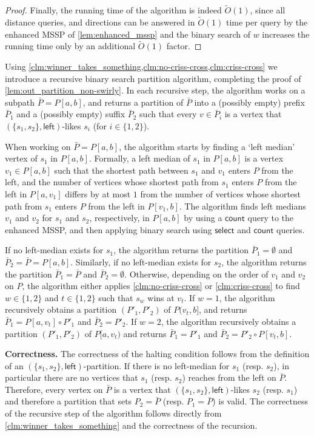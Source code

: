 \documentclass{article}
\newcommand{\leftside}{\mathsf{left}}
\newcommand{\countA}{\mathsf{count}}
\newcommand{\select}{\mathsf{select}}
\newcommand{\Otild}{\tilde{O}}
\begin{document}
\begin{proof}
Finally, the running time of the algorithm is indeed $\Otild(1)$, since all distance queries, and directions can be answered in $\Otild(1)$ time per query by the enhanced MSSP of \cref{lem:enhanced_mssp} and the binary search of $w$ increases the running time only by an additional $\Otild(1)$ factor.
\end{proof}


Using \cref{clm:winner_takes_something,clm:no-criss-cross,clm:criss-cross} we introduce a recursive binary search partition algorithm, completing the proof of \cref{lem:out_partition_non-swirly}.
In each recursive step, the algorithm works on a subpath $\bar P=P[a,b]$, and returns a partition of $\bar P$ into a (possibly empty) prefix $\bar P_1$ and a (possibly empty) suffix $\bar P_2$  such that every $v\in\bar P_i$  is a vertex that $(\{s_1,s_2\},\leftside)$-likes $s_i$ (for $i\in\{1,2\}$).

When working on $\bar P = P[a,b]$, the algorithm starts by finding a `left median' vertex of $s_1$ in $P[a,b]$.
Formally, a left median of $s_1$ in $P[a,b]$ is a vertex $v_1 \in P[a,b]$ such that the shortest path between $s_1$ and $v_1$ enters $P$ from the left, and the number of vertices whose shortest path from $s_1$ enters $P$ from the left  in $P[a,v_1]$ differs by at most  $1$ from the number of vertices whose shortest path from $s_1$ enters $P$ from the left in $P[v_1,b]$.
The algorithm finds left medians $v_1$ and $v_2$ for $s_1$ and $s_2$, respectively, in $P[a,b]$ by using a $\countA$ query to the enhanced MSSP, and then applying binary search using $\select$ and $\countA$ queries.

If no left-median exists for $s_1$, the algorithm returns the partition $\bar P_1 = \emptyset$ and $\bar P_2 = \bar P = P[a,b]$.
Similarly, if no left-median exists for $s_2$, the algorithm returns the partition $\bar P_1 = \bar{P}$ and $\bar P_2 = \emptyset$.
Otherwise, depending on the order of $v_1$ and $v_2$ on $P$, the algorithm either applies \cref{clm:no-criss-cross} or \cref{clm:criss-cross} to find $w\in \{ 1,2\}$ and $t\in \{1,2\}$ such that $s_w$ wins at $v_t$.
If $w=1$, the algorithm recursively obtains a partition $(P'_1,P'_2)$ of $P(v_t,b]$, and returns $\bar P_1 = P[a,v_t] \circ P'_1$ and $\bar P_2 = P'_2$.
If $w = 2$, the algorithm recursively obtains a partition $(P'_1,P'_2)$ of $P[a,v_t)$ and returns $\bar P_1 = P'_1$ and $\bar P_2 = P'_2 \circ P[v_t,b]$.

\medskip
\noindent
{\bf Correctness.}
The correctness of the halting condition follows from the definition of an $(\{s_1,s_2\},\leftside)$-partition.
If there is no left-median for $s_1$ (resp. $s_2$), in particular there are no vertices that $s_1$ (resp. $s_2$) reaches from the left on $\bar P$.
Therefore, every vertex on $\bar P$ is a vertex that $(\{s_1,s_2\},\leftside)$-likes $s_2$ (resp. $s_1$) and therefore a partition that sets $P_2 = \bar P$ (resp. $P_1 = \bar{P}$) is valid.
The correctness of the recursive step of the algorithm follows directly from \cref{clm:winner_takes_something} and the correctness of the recursion.
\end{document}
